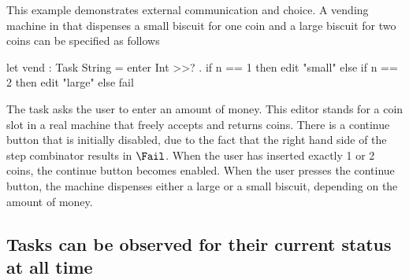\begin{example}
\label{Vending machine}

This example demonstrates external communication and choice.
A vending machine in \TOPHAT that dispenses a small biscuit for one coin and a large biscuit for two coins can be specified as follows
\begin{TASK}
  let vend : Task String = enter Int >>? \n. if n == 1 then edit "small"
                                                       else if n == 2 then edit "large"
                                                                      else fail
\end{TASK}
The task asks the user to enter an amount of money.
This editor stands for a coin slot in a real machine that freely accepts and returns coins.
There is a continue button that is initially disabled, due to the fact that the right hand side of the step combinator results in $\Fail$.
When the user has inserted exactly 1 or 2 coins, the continue button becomes enabled.
When the user presses the continue button, the machine dispenses either a large or a small biscuit, depending on the amount of money.

\end{example}



\subsection{Tasks can be observed for their current status at all time}


